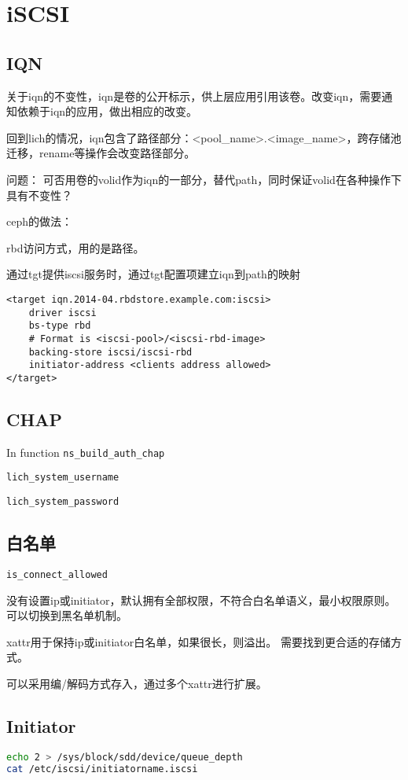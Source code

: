 \chapter{iSCSI}

\section{IQN}

关于iqn的不变性，iqn是卷的公开标示，供上层应用引用该卷。改变iqn，需要通知依赖于iqn的应用，做出相应的改变。

回到lich的情况，iqn包含了路径部分：<pool\_name>.<image\_name>，跨存储池迁移，rename等操作会改变路径部分。

问题： 可否用卷的volid作为iqn的一部分，替代path，同时保证volid在各种操作下具有不变性？

ceph的做法：
\begin{compactenum}
\item rbd访问方式，用的是路径。
\item 通过tgt提供iscsi服务时，通过tgt配置项建立iqn到path的映射
\end{compactenum}

\begin{lstlisting}[frame=single]
<target iqn.2014-04.rbdstore.example.com:iscsi>
    driver iscsi
    bs-type rbd
    # Format is <iscsi-pool>/<iscsi-rbd-image>
    backing-store iscsi/iscsi-rbd  
    initiator-address <clients address allowed>
</target>
\end{lstlisting}

\section{CHAP}

In function \verb|ns_build_auth_chap|
\begin{compactitem}
\item \verb|lich_system_username|
\item \verb|lich_system_password|
\end{compactitem}

\section{白名单}

\begin{compactitem}
\item \verb|is_connect_allowed|
\end{compactitem}

没有设置ip或initiator，默认拥有全部权限，不符合白名单语义，最小权限原则。
可以切换到黑名单机制。

xattr用于保持ip或initiator白名单，如果很长，则溢出。
需要找到更合适的存储方式。

可以采用编/解码方式存入，通过多个xattr进行扩展。

\section{Initiator}

\begin{lstlisting}[language=bash,frame=single]
echo 2 > /sys/block/sdd/device/queue_depth
cat /etc/iscsi/initiatorname.iscsi
\end{lstlisting}
